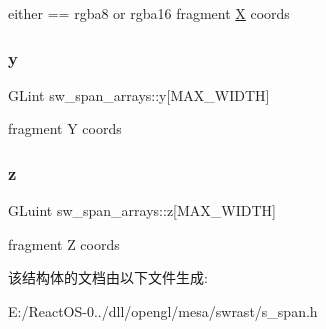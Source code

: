 either == rgba8 or rgba16 fragment \hyperlink{class_x}{X} coords \mbox{\label{structsw__span__arrays_ae4259320c4c6c02e150707c0c041951d}} 
\subsubsection{\texorpdfstring{y}{y}}
{\footnotesize\ttfamily G\+Lint sw\+\_\+span\+\_\+arrays\+::y\mbox{[}M\+A\+X\+\_\+\+W\+I\+D\+TH\mbox{]}}

fragment Y coords \mbox{\label{structsw__span__arrays_a54524d3ba7c31144ac8e9044617a93c7}} 
\subsubsection{\texorpdfstring{z}{z}}
{\footnotesize\ttfamily G\+Luint sw\+\_\+span\+\_\+arrays\+::z\mbox{[}M\+A\+X\+\_\+\+W\+I\+D\+TH\mbox{]}}

fragment Z coords 

该结构体的文档由以下文件生成\+:\begin{DoxyCompactItemize}
\item 
E\+:/\+React\+O\+S-\/0../dll/opengl/mesa/swrast/s\+\_\+span.\+h\end{DoxyCompactItemize}
